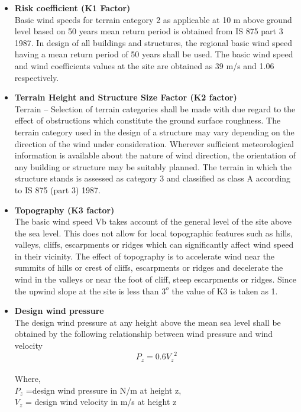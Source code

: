 \begin{itemize}

\item
\textbf{Risk coefficient (K1 Factor)}\\
Basic wind speeds for terrain category 2 as applicable at 10 m above ground level based on 50 years mean return period is obtained from IS 875 part 3 1987. In design of all buildings and structures, the regional basic wind speed having a mean return period of 50 years shall be used. The basic wind speed and wind coefficients values at the site are obtained as 39 m/s and 1.06 respectively.\\

\item
\textbf{Terrain Height and Structure Size Factor (K2 factor)}\\
Terrain – Selection of terrain categories shall be made with due regard to the effect of obstructions which constitute the ground surface roughness. The terrain category used in the design of a structure may vary depending on the direction of the wind under consideration. Wherever sufficient meteorological information is available about the nature of wind direction, the orientation of any building or structure may be suitably planned. The terrain in which the structure stands is assessed as category 3 and classified as class A according to IS 875 (part 3) 1987.
\item
\textbf{Topography (K3 factor)}\\
The basic wind speed Vb takes account of the general level of the site above the sea level. This does not allow for local topographic features such as hills, valleys, cliffs, escarpments or ridges which can significantly affect wind speed in their vicinity. The effect of topography is to accelerate wind near the summits of hills or crest of cliffs, escarpments or ridges and decelerate the wind in the valleys or near the foot of cliff, steep escarpments or ridges. Since the upwind slope at the site is less than $3^{o}$ the value of K3 is taken as 1.\\

\item
\textbf{Design wind pressure}\\
The design wind pressure at any height above the mean sea level shall be obtained by the following relationship between wind pressure and wind velocity\\
\begin{equation}P_{z} =0.6{V_{z}}^2 
\end{equation}\\
Where,\\$ P_{z}$ =design wind pressure in N/m at height z,\\
$V_{z}$ = design wind velocity in m/s at height z\\
\end{itemize}
